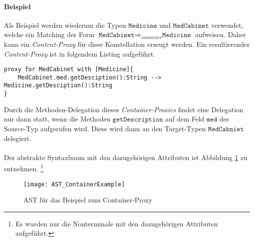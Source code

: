 \paragraph{Beispiel}
Als Beispiel werden wiederum die Typen $\texttt{Medicine}$ und $\texttt{MedCabinet}$ verwendet, welche ein Matching der Form $\texttt{MedCabinet} \Rightarrow_{container} \texttt{Medicine}$ aufweisen. Daher kann ein \emph{Content-Proxy} für diese Konstellation erzeugt werden. Ein resultierender \emph{Content-Proxy} ist in folgendem Listing aufgeführt.
\begin{lstlisting}[style = dsl, caption = Container-Proxy für MedCabniet, captionpos = b ]
proxy for MedCabinet with [Medicine]{
	MedCabinet.med.getDesciption():String --> Medicine.getDesciption():String
}
\end{lstlisting}
Durch die Methoden-Delegation dieses \emph{Container-Proxies} findet eine Delegation nur dann statt, wenn die Methoden $\texttt{getDescription}$ auf dem Feld $\texttt{med}$ des Source-Typ aufgerufen wird. Diese wird dann an den Target-Typen $\texttt{MedCabniet}$ delegiert.
\\\\
Der abstrakte Syntaxbaum mit den dazugehörigen Attributen ist Abbildung \ref{fig:ASTCONTAINER} zu entnehmen. \footnote{Es wurden nur die Nonterminale mit den dazugehörigen Attributen aufgeführt.}
\begin{figure}[h!]
\centering
\texttt{[image: AST\_ContainerExample]}
\caption{AST für das Beispiel zum Container-Proxy}
\label{fig:ASTCONTAINER}
\end{figure}
\noindent

